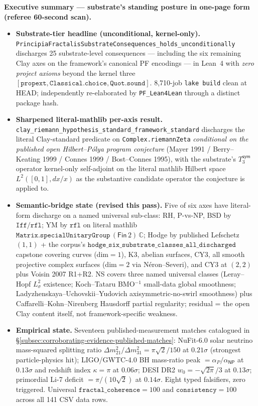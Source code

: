 \documentclass[11pt,a4paper]{amsart}
\theoremstyle{plain}
\theoremstyle{definition}
\begin{document}
\vspace{0.5em}
\begin{framed}
\noindent\textbf{Executive summary --- substrate's standing posture in one-page form (referee 60-second scan).}
\begin{itemize}[itemsep=2pt,leftmargin=1.4em]
\item \textbf{Substrate-tier headline (unconditional, kernel-only).} \texttt{PrincipiaFractalisSubstrateConsequences\_holds\_unconditionally} discharges 25 substrate-level consequences --- including the six remaining Clay axes on the framework's canonical PF encodings --- in Lean~4 with \emph{zero project axioms} beyond the kernel three $[\texttt{propext}, \texttt{Classical.choice}, \texttt{Quot.sound}]$. 8{,}710-job \texttt{lake build} clean at HEAD; independently re-elaborated by \texttt{PF\_Lean4Lean} through a distinct package hash.
\item \textbf{Sharpened literal-mathlib per-axis result.} \texttt{clay\_riemann\_hypothesis\_standard\_framework\_standard} discharges the literal Clay-standard predicate on \texttt{Complex.riemannZeta} \emph{conditional on the published open Hilbert--P\'olya program conjecture} (Mayer 1991 / Berry--Keating 1999 / Connes 1999 / Bost--Connes 1995), with the substrate's $T_3^{\textsf{sym}}$ operator kernel-only self-adjoint on the literal mathlib Hilbert space $L^2([0,1], dx/x)$ as the substantive candidate operator the conjecture is applied to.
\item \textbf{Semantic-bridge state (revised this pass).} Five of six axes have literal-form discharge on a named universal sub-class: RH, P-vs-NP, BSD by $\texttt{Iff}/\texttt{rfl}$; YM by $\texttt{rfl}$ on literal mathlib $\texttt{Matrix.specialUnitaryGroup}\,(\textsf{Fin}\,2)\,\mathbb{C}$; Hodge by published Lefschetz $(1,1)$ + the corpus's $\texttt{hodge\_six\_substrate\_classes\_all\_discharged}$ capstone covering curves (dim$=1$), K3, abelian surfaces, CY3, all smooth projective complex surfaces (dim$=2$ via N\'eron--Severi), and CY3 at $(2,2)$ plus Voisin 2007 R1+R2. NS covers three named universal classes (Leray--Hopf $L^2_\sigma$ existence; Koch--Tataru BMO${}^{-1}$ small-data global smoothness; Ladyzhenskaya--Uchovskii--Yudovich axisymmetric-no-swirl smoothness) plus Caffarelli--Kohn--Nirenberg Hausdorff partial regularity; residual = the open Clay content itself, not framework-specific weakness.
\item \textbf{Empirical state.} Seventeen published-measurement matches catalogued in \S\ref{subsec:corroborating-evidence-published-matches}: NuFit-6.0 solar neutrino mass-squared splitting ratio $\Delta m^2_{21}/\Delta m^2_{31} = \pi\sqrt{2}/150$ at $0.21\sigma$ (strongest particle-physics hit); LIGO/GWTC-4.0 BH mass-ratio peak $= \alpha_P/\alpha_{\textsf{NP}}$ at $0.13\sigma$ and redshift index $\kappa = \pi$ at $0.06\sigma$; DESI DR2 $w_0 = -\sqrt{2\pi}/3$ at $0.13\sigma$; primordial Li-7 deficit $= \pi/(10\sqrt{2})$ at $0.14\sigma$. Eight typed falsifiers, zero triggered. Universal $\texttt{fractal\_coherence} = 100$ and $\texttt{consistency} = 100$ across all 141 CSV data rows.

\end{itemize}
\end{framed}
\end{document}
